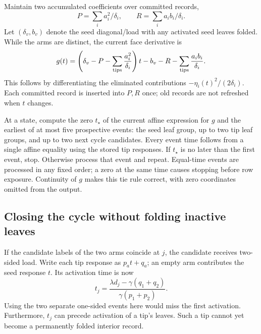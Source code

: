 Maintain two accumulated coefficients over committed records,
\[
 P=\sum_i a_i^2/\delta_i,\qquad
 R=\sum_i a_i b_i/\delta_i.
\]
Let $(\delta_v,b_v)$ denote the seed diagonal/load with any activated seed
leaves folded. While the arms are distinct, the current face derivative is
\begin{equation}
 g(t)=\left(\delta_v-P-\sum_{\rm tips}\frac{a_i^2}{\delta_i}\right)t
       -b_v-R-\sum_{\rm tips}\frac{a_i b_i}{\delta_i}.
 \label{eq:op3-cycle-root-derivative}
\end{equation}
This follows by differentiating the eliminated contributions
$-\eta_i(t)^2/(2\delta_i)$. Each committed record is inserted into $P,R$
once; old records are not refreshed when $t$ changes.

At a state, compute the zero $t_\star$ of the current affine expression
for $g$ and the earliest of at most five prospective events: the seed leaf
group, up to two tip leaf groups, and up to two next cycle candidates.
Every event time follows from a single affine equality using the stored
tip responses. If $t_\star$ is no later than the first event, stop.
Otherwise process that event and repeat. Equal-time events are processed
in any fixed order; a zero at the same time causes stopping before row
exposure. Continuity of $g$ makes this tie rule correct, with zero
coordinates omitted from the output.

\subsection{Closing the cycle without folding inactive leaves}

If the candidate labels of the two arms coincide at $j$, the candidate
receives two-sided load. Write each tip response as $p_a t+q_a$; an empty
arm contributes the seed response $t$. Its activation time is now
\begin{equation}
 t_j=\frac{\lambda d_j-\gamma(q_1+q_2)}
                 {\gamma(p_1+p_2)}.
 \label{eq:op3-cycle-close-time}
\end{equation}
Using the two separate one-sided events here would miss the first
activation. Furthermore, $t_j$ can precede activation of a tip's leaves.
Such a tip cannot yet become a permanently folded interior record.

